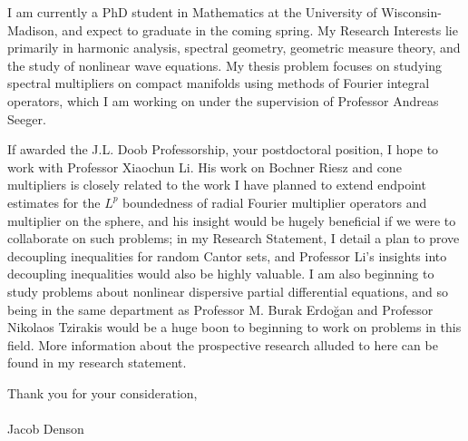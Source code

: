 \documentclass[11pt,stdletter,orderfromtodate,sigleft]{newlfm}
\begin{document}
\begin{newlfm}

I am currently a PhD student in Mathematics at the University of Wisconsin-Madison, and expect to graduate in the coming spring. My Research Interests lie primarily in harmonic analysis, spectral geometry, geometric measure theory, and the study of nonlinear wave equations. My thesis problem focuses on studying spectral multipliers on compact manifolds using methods of Fourier integral operators, which I am working on under the supervision of Professor Andreas Seeger.

If awarded the J.L. Doob Professorship, your postdoctoral position, I hope to work with Professor Xiaochun Li. His work on Bochner Riesz and cone multipliers is closely related to the work I have planned to extend endpoint estimates for the $L^p$ boundedness of radial Fourier multiplier operators and multiplier on the sphere, and his insight would be hugely beneficial if we were to collaborate on such problems; in my Research Statement, I detail a plan to prove decoupling inequalities for random Cantor sets, and Professor Li's insights into decoupling inequalities would also be highly valuable. I am also beginning to study problems about nonlinear dispersive partial differential equations, and so being in the same department as Professor M. Burak Erdoğan and Professor Nikolaos Tzirakis would be a huge boon to beginning to work on problems in this field. More information about the prospective research alluded to here can be found in my research statement.

Thank you for your consideration,\\\\
Jacob Denson

\end{newlfm}
\end{document}
